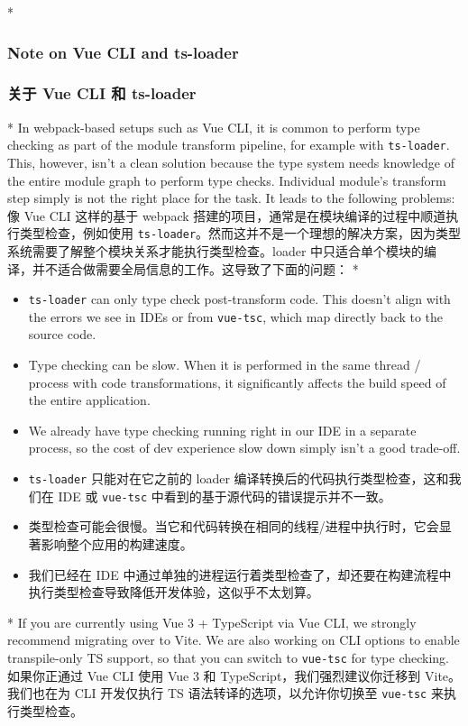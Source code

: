 \begin{paracol}{2} 
 
\switchcolumn[0]*%
\subsubsection{Note on Vue CLI and ts-loader}
\switchcolumn
\subsubsection{关于 Vue CLI 和 ts-loader}
\switchcolumn[0]*%
In webpack-based setups such as Vue CLI, it is common to perform type
checking as part of the module transform pipeline, for example with
\texttt{ts-loader}. This, however, isn't a clean solution because the
type system needs knowledge of the entire module graph to perform type
checks. Individual module's transform step simply is not the right place
for the task. It leads to the following problems:
\switchcolumn
像 Vue CLI 这样的基于 webpack
搭建的项目，通常是在模块编译的过程中顺道执行类型检查，例如使用
\texttt{ts-loader}。然而这并不是一个理想的解决方案，因为类型系统需要了解整个模块关系才能执行类型检查。loader
中只适合单个模块的编译，并不适合做需要全局信息的工作。这导致了下面的问题：
\switchcolumn[0]*%
\begin{itemize}
\item
  \texttt{ts-loader} can only type check post-transform code. This
  doesn't align with the errors we see in IDEs or from \texttt{vue-tsc},
  which map directly back to the source code.
\item
  Type checking can be slow. When it is performed in the same thread /
  process with code transformations, it significantly affects the build
  speed of the entire application.
\item
  We already have type checking running right in our IDE in a separate
  process, so the cost of dev experience slow down simply isn't a good
  trade-off.
\end{itemize}
\switchcolumn
\begin{itemize}
\item
  \texttt{ts-loader} 只能对在它之前的 loader
  编译转换后的代码执行类型检查，这和我们在 IDE 或 \texttt{vue-tsc}
  中看到的基于源代码的错误提示并不一致。
\item
  类型检查可能会很慢。当它和代码转换在相同的线程/进程中执行时，它会显著影响整个应用的构建速度。
\item
  我们已经在 IDE
  中通过单独的进程运行着类型检查了，却还要在构建流程中执行类型检查导致降低开发体验，这似乎不太划算。
\end{itemize}
\switchcolumn[0]*%
If you are currently using Vue 3 + TypeScript via Vue CLI, we strongly
recommend migrating over to Vite. We are also working on CLI options to
enable transpile-only TS support, so that you can switch to
\texttt{vue-tsc} for type checking.
\switchcolumn
如果你正通过 Vue CLI 使用 Vue 3 和 TypeScript，我们强烈建议你迁移到
Vite。我们也在为 CLI 开发仅执行 TS 语法转译的选项，以允许你切换至
\texttt{vue-tsc} 来执行类型检查。
\end{paracol}



